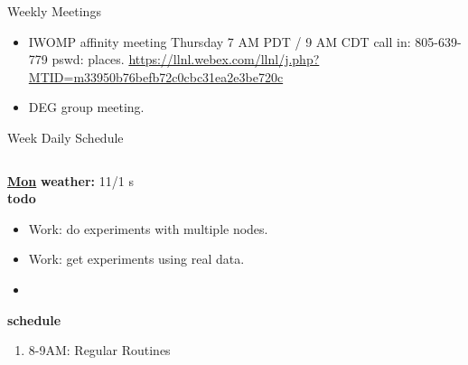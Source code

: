 \begin{multicols}{4}
\begin{columns}
\begin{column}{0.6\linewidth}
      \begin{block}{Weekly Meetings}
        \begin{itemize}
          \tiny \item \tiny IWOMP affinity meeting Thursday 7 AM PDT / 9 AM
          CDT call in: 805-639-779 pswd: places. \url{https://llnl.webex.com/llnl/j.php?MTID=m33950b76befb72c0cbc31ea2e3be720c}
        \item \tiny DEG group meeting.  
        \end{itemize}
      \end{block} 
      \begin{block}{Week Daily Schedule}
        \begin{columns}
          \begin{column}{0.14\textwidth}{\small \underline{\bf Mon}}
            {\tiny \bf {\tiny weather:} } {\tiny 11/1 s} \\ 
            {\tiny \bf {\tiny todo}}\\ 
            \begin{itemize}
              \tiny \item \tiny Work: do experiments with multiple nodes. 
            \item \tiny Work: get experiments using real data.  
            \item \tiny 
            \end{itemize}
                {\small  \bf schedule}\\
                \begin{enumerate} 
                  \tiny \item \tiny 8-9AM: Regular Routines 
                \end{enumerate}
          \end{column}


\end{columns}
\end{block}
\end{column}
\end{columns}
\end{multicols}
